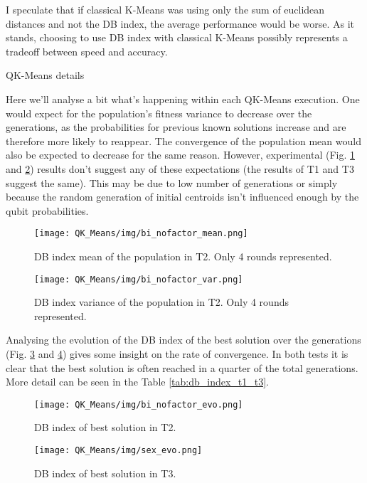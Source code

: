 I speculate that if classical K-Means was using only the sum of euclidean distances and not the DB index, the average performance would be worse. As it stands, choosing to use DB index with classical K-Means possibly represents a tradeoff between speed and accuracy.

QK-Means details

Here we’ll analyse a bit what’s happening within each QK-Means execution. One would expect for the population’s fitness variance to decrease over the generations, as the probabilities for previous known solutions increase and are therefore more likely to reappear. The convergence of the population mean would also be expected to decrease for the same reason. However, experimental (Fig. \ref{fig:db_index_mean_t2} and \ref{fig:db_index_var_t2}) results don’t suggest any of these expectations (the results of T1 and T3 suggest the same). This may be due to low number of generations or simply because the random generation of initial centroids isn’t influenced enough by the qubit probabilities.


\begin{figure}[hbtp]
\centering
\texttt{[image: QK\_Means/img/bi\_nofactor\_mean.png]}
\caption{DB index mean of the population in T2. Only 4 rounds represented.}
\label{fig:db_index_mean_t2}
\end{figure}

\begin{figure}[hbtp]
\centering
\texttt{[image: QK\_Means/img/bi\_nofactor\_var.png]}
\caption{DB index variance of the population in T2. Only 4 rounds represented.}
\label{fig:db_index_var_t2}
\end{figure}


Analysing the evolution of the DB index of the best solution over the generations (Fig. \ref{fig:qk_db_index_best_evo_t2} and \ref{fig:qk_db_index_best_evo_t3}) gives some insight on the rate of convergence. In both tests it is clear that the best solution is often reached in a quarter of the total generations. More detail can be seen in the Table \ref{tab:db_index_t1_t3}.

\begin{figure}[hbtp]
\centering
\texttt{[image: QK\_Means/img/bi\_nofactor\_evo.png]}
\caption{DB index of best solution in T2.}
\label{fig:qk_db_index_best_evo_t2}
\end{figure}


\begin{figure}[hbtp]
\centering
\texttt{[image: QK\_Means/img/sex\_evo.png]}
\caption{DB index of best solution in T3.}
\label{fig:qk_db_index_best_evo_t3}
\end{figure}

